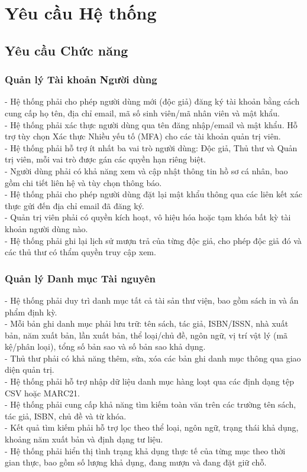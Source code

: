 \section{Yêu cầu Hệ thống}
\subsection{Yêu cầu Chức năng}
\subsubsection{Quản lý Tài khoản Người dùng}
- Hệ thống phải cho phép người dùng mới (độc giả) đăng ký tài khoản bằng cách cung cấp họ tên, địa chỉ email, mã số sinh viên/mã nhân viên và mật khẩu. \\
- Hệ thống phải xác thực người dùng qua tên đăng nhập/email và mật khẩu. Hỗ trợ tùy chọn Xác thực Nhiều yếu tố (MFA) cho các tài khoản quản trị viên. \\
- Hệ thống phải hỗ trợ ít nhất ba vai trò người dùng: Độc giả, Thủ thư và Quản trị viên, mỗi vai trò được gán các quyền hạn riêng biệt.\\
- Người dùng phải có khả năng xem và cập nhật thông tin hồ sơ cá nhân, bao gồm chi tiết liên hệ và tùy chọn thông báo.\\
- Hệ thống phải cho phép người dùng đặt lại mật khẩu thông qua các liên kết xác thực gửi đến địa chỉ email đã đăng ký.\\
- Quản trị viên phải có quyền kích hoạt, vô hiệu hóa hoặc tạm khóa bất kỳ tài khoản người dùng nào.\\
- Hệ thống phải ghi lại lịch sử mượn trả của từng độc giả, cho phép độc giả đó và các thủ thư có thẩm quyền truy cập xem.\\

\subsubsection{Quản lý Danh mục Tài nguyên}
- Hệ thống phải duy trì danh mục tất cả tài sản thư viện, bao gồm sách in và ấn phẩm định kỳ.\\
- Mỗi bản ghi danh mục phải lưu trữ: tên sách, tác giả, ISBN/ISSN, nhà xuất bản, năm xuất bản, lần xuất bản, thể loại/chủ đề, ngôn ngữ, vị trí vật lý (mã kệ/phân loại), tổng số bản sao và số bản sao khả dụng.\\
- Thủ thư phải có khả năng thêm, sửa, xóa các bản ghi danh mục thông qua giao diện quản trị.\\
- Hệ thống phải hỗ trợ nhập dữ liệu danh mục hàng loạt qua các định dạng tệp CSV hoặc MARC21.\\
- Hệ thống phải cung cấp khả năng tìm kiếm toàn văn trên các trường tên sách, tác giả, ISBN, chủ đề và từ khóa.\\
- Kết quả tìm kiếm phải hỗ trợ lọc theo thể loại, ngôn ngữ, trạng thái khả dụng, khoảng năm xuất bản và định dạng tư liệu.\\
- Hệ thống phải hiển thị tình trạng khả dụng thực tế của từng mục theo thời gian thực, bao gồm số lượng khả dụng, đang mượn và đang đặt giữ chỗ.\\

